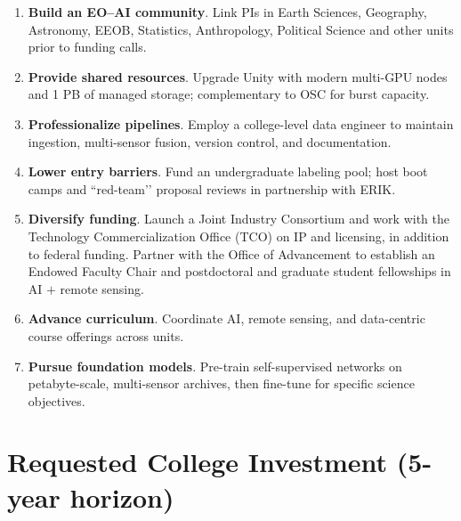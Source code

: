 \documentclass[11pt]{article}
\newcommand{\ylcom}[1]{{\color{blue}(YL: #1)}}
\begin{document}
\begin{enumerate}[leftmargin=*,itemsep=4pt]
\item \textbf{Build an EO–AI community}.  Link PIs in Earth Sciences, Geography, Astronomy, EEOB, Statistics, Anthropology, Political Science and other units prior to funding calls.  
\item \textbf{Provide shared resources}.  Upgrade Unity with modern multi-GPU nodes and 1 PB of managed storage; complementary to OSC for burst capacity.  
\item \textbf{Professionalize pipelines}.  Employ a college-level data engineer to maintain ingestion, multi-sensor fusion, version control, and documentation.  
\item \textbf{Lower entry barriers}.  Fund an undergraduate labeling pool; host boot camps and “red-team’’ proposal reviews in partnership with ERIK.  
\item \textbf{Diversify funding}.  Launch a Joint Industry Consortium and work with the Technology Commercialization Office (TCO) on IP and licensing, in addition to federal funding. Partner with the Office of Advancement to establish an Endowed Faculty Chair and postdoctoral and graduate student fellowships in AI $+$ remote sensing.
\item \textbf{Advance curriculum}.  Coordinate AI, remote sensing, and data-centric course offerings across units.  
\item \textbf{Pursue foundation models}.  Pre-train self-supervised networks on petabyte-scale, multi-sensor archives, then fine-tune for specific science objectives.  
\end{enumerate}
  
\section*{Requested College Investment (5-year horizon)}
\end{document}
